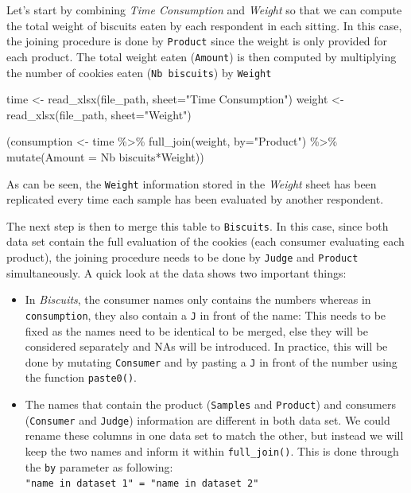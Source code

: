 \documentclass[
]{book}
\newenvironment{Shaded}{\begin{snugshade}}{\end{snugshade}}
\newcommand{\AttributeTok}[1]{\textcolor[rgb]{0.77,0.63,0.00}{#1}}
\newcommand{\FunctionTok}[1]{\textcolor[rgb]{0.00,0.00,0.00}{#1}}
\newcommand{\NormalTok}[1]{#1}
\newcommand{\OtherTok}[1]{\textcolor[rgb]{0.56,0.35,0.01}{#1}}
\newcommand{\SpecialCharTok}[1]{\textcolor[rgb]{0.00,0.00,0.00}{#1}}
\newcommand{\StringTok}[1]{\textcolor[rgb]{0.31,0.60,0.02}{#1}}
\providecommand{\tightlist}{%
  \setlength{\itemsep}{0pt}\setlength{\parskip}{0pt}}
\begin{document}
Let's start by combining \emph{Time Consumption} and \emph{Weight} so that we can compute the total weight of biscuits eaten by each respondent in each sitting. In this case, the joining procedure is done by \texttt{Product} since the weight is only provided for each product. The total weight eaten (\texttt{Amount}) is then computed by multiplying the number of cookies eaten (\texttt{Nb\ biscuits}) by \texttt{Weight}

\begin{Shaded}
\begin{Highlighting}[]
\NormalTok{time }\OtherTok{\textless{}{-}} \FunctionTok{read\_xlsx}\NormalTok{(file\_path, }\AttributeTok{sheet=}\StringTok{"Time Consumption"}\NormalTok{)}
\NormalTok{weight }\OtherTok{\textless{}{-}} \FunctionTok{read\_xlsx}\NormalTok{(file\_path, }\AttributeTok{sheet=}\StringTok{"Weight"}\NormalTok{)}

\NormalTok{(consumption }\OtherTok{\textless{}{-}}\NormalTok{ time }\SpecialCharTok{\%\textgreater{}\%} 
  \FunctionTok{full\_join}\NormalTok{(weight, }\AttributeTok{by=}\StringTok{"Product"}\NormalTok{) }\SpecialCharTok{\%\textgreater{}\%} 
  \FunctionTok{mutate}\NormalTok{(}\AttributeTok{Amount =} \StringTok{\textasciigrave{}}\AttributeTok{Nb biscuits}\StringTok{\textasciigrave{}}\SpecialCharTok{*}\NormalTok{Weight))}
\end{Highlighting}
\end{Shaded}

As can be seen, the \texttt{Weight} information stored in the \emph{Weight} sheet has been replicated every time each sample has been evaluated by another respondent.

The next step is then to merge this table to \texttt{Biscuits}. In this case, since both data set contain the full evaluation of the cookies (each consumer evaluating each product), the joining procedure needs to be done by \texttt{Judge} and \texttt{Product} simultaneously. A quick look at the data shows two important things:

\begin{itemize}
\tightlist
\item
  In \emph{Biscuits}, the consumer names only contains the numbers whereas in \texttt{consumption}, they also contain a \texttt{J} in front of the name: This needs to be fixed as the names need to be identical to be merged, else they will be considered separately and NAs will be introduced. In practice, this will be done by mutating \texttt{Consumer} and by pasting a \texttt{J} in front of the number using the function \texttt{paste0()}.
\item
  The names that contain the product (\texttt{Samples} and \texttt{Product}) and consumers (\texttt{Consumer} and \texttt{Judge}) information are different in both data set. We could rename these columns in one data set to match the other, but instead we will keep the two names and inform it within \texttt{full\_join()}. This is done through the \texttt{by} parameter as following: \texttt{"name\ in\ dataset\ 1"\ =\ "name\ in\ dataset\ 2"}
\end{itemize}
\end{document}
